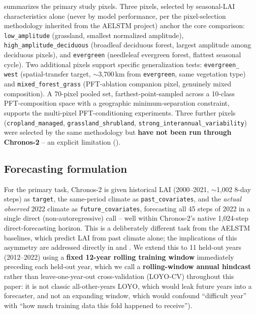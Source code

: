 \documentclass[11pt]{article}
\begin{document}
 summarizes the primary study pixels. Three pixels, selected by seasonal-LAI
characteristics alone (never by model performance, per the pixel-selection methodology inherited
from the AELSTM project) anchor the core comparison: \texttt{low\_amplitude} (grassland, smallest
normalized amplitude), \texttt{high\_amplitude\_deciduous} (broadleaf deciduous forest, largest
amplitude among deciduous pixels), and \texttt{evergreen} (needleleaf evergreen forest, flattest
seasonal cycle). Two additional pixels support specific generalization tests: \texttt{evergreen\_%
west} (spatial-transfer target, $\sim$3{,}700\,km from \texttt{evergreen}, same vegetation type)
and \texttt{mixed\_forest\_grass} (PFT-ablation companion pixel, genuinely mixed composition). A
70-pixel pooled set, farthest-point-sampled across a 10-class PFT-composition space with a
geographic minimum-separation constraint, supports the multi-pixel PFT-conditioning experiments.
Three further pixels (\texttt{cropland\_managed}, \texttt{grassland\_shrubland},
\texttt{strong\_interannual\_variability}) were selected by the same methodology but \textbf{have
not been run through Chronos-2} -- an explicit limitation ().



\subsection{Forecasting formulation}
\label{sec:data-formulation}

For the primary task, Chronos-2 is given historical LAI (2000--2021, $\sim$1{,}002 8-day steps) as
\texttt{target}, the same-period climate as \texttt{past\_covariates}, and the \emph{actual
observed} 2022 climate as \texttt{future\_covariates}, forecasting all 45 steps of 2022 in a
single direct (non-autoregressive) call -- well within Chronos-2's native 1{,}024-step
direct-forecasting horizon. This is a deliberately different task from the AELSTM baselines,
which predict LAI from past climate alone; the implications of this asymmetry are addressed
directly in  and . We extend this to 11
held-out years (2012--2022) using a \textbf{fixed 12-year rolling training window} immediately
preceding each held-out year, which we call a \textbf{rolling-window annual hindcast} rather than
leave-one-year-out cross-validation (LOYO-CV) throughout this paper: it is not classic
all-other-years LOYO, which would leak future years into a forecaster, and not an expanding
window, which would confound ``difficult year'' with ``how much training data this fold happened
to receive'').
\end{document}
